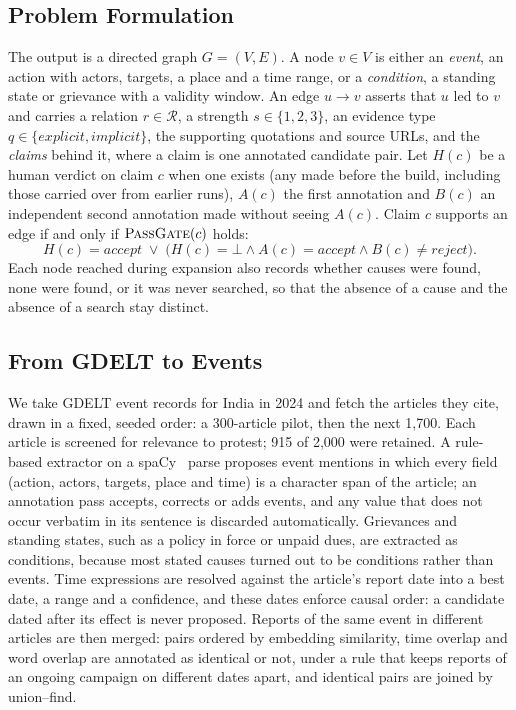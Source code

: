 \documentclass[conference]{IEEEtran}
\begin{document}
\subsection{Problem Formulation}
The output is a directed graph $G=(V,E)$. A node $v\in V$ is either an \emph{event}, an action with
actors, targets, a place and a time range, or a \emph{condition}, a standing state or grievance
with a validity window. An edge $u\rightarrow v$ asserts that $u$ led to $v$ and carries a relation
$r\in\mathcal{R}$, a strength $s\in\{1,2,3\}$, an evidence type
$q\in\{\textit{explicit},\textit{implicit}\}$, the supporting quotations and source URLs, and the
\emph{claims} behind it, where a claim is one annotated candidate pair. Let $H(c)$ be a human verdict
on claim $c$ when one exists (any made before the build, including those carried over from
earlier runs), $A(c)$ the first annotation and $B(c)$ an independent second
annotation made without seeing $A(c)$. Claim $c$ supports an edge if and only if
$\textsc{PassGate}(c)$ holds:
\begin{equation}
H(c)=\textit{accept} \;\lor\; \bigl(H(c)=\bot \land A(c)=\textit{accept} \land
B(c)\neq\textit{reject}\bigr).
\label{eq:gate}
\end{equation}
Each node reached during expansion also records whether causes were found, none were found, or it
was never searched, so that the absence of a cause and the absence of a search stay distinct.

\subsection{From GDELT to Events}
We take GDELT event records for India in 2024 and fetch the articles they cite, drawn in a fixed,
seeded order: a 300-article pilot, then the next 1{,}700. Each article is screened for relevance to
protest; 915 of 2{,}000 were retained. A rule-based extractor on a spaCy~\cite{spacy} parse proposes
event mentions in which every field (action, actors, targets, place and time) is a character span
of the article; an annotation pass accepts, corrects or adds events, and any value that does not
occur verbatim in its sentence is discarded automatically. Grievances and standing states, such as a
policy in force or unpaid dues, are extracted as conditions, because most stated causes turned out
to be conditions rather than events. Time expressions are resolved against the article's report date
into a best date, a range and a confidence, and these dates enforce causal order: a candidate dated
after its effect is never proposed. Reports of the same event in different articles are then
merged: pairs ordered by embedding similarity, time overlap and word overlap are annotated as
identical or not, under a rule that keeps reports of an ongoing campaign on different dates apart,
and identical pairs are joined by union--find.
\end{document}

